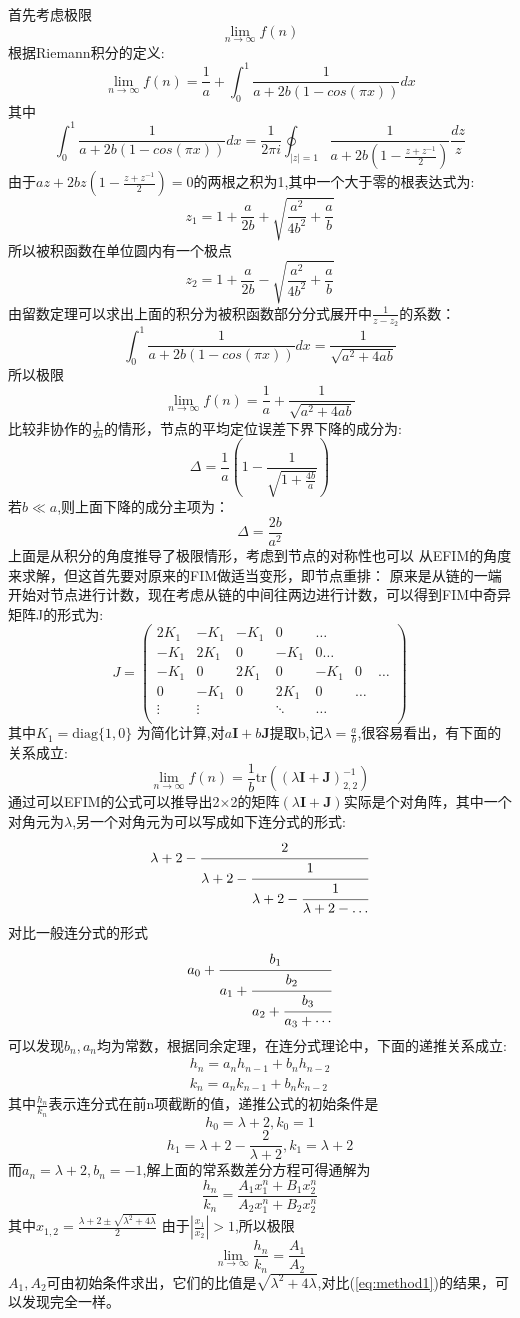 \documentclass[12pt]{article}
\theoremstyle{remark}
\begin{document}
首先考虑极限\[
\lim_{n\rightarrow \infty}f(n)
\]
根据Riemann积分的定义:
\[
\lim_{n\rightarrow \infty}f(n)=\frac{1}{a}+\int_0^1 \frac{1}{a+2b(1-cos(\pi x))}dx
\]
其中
\[
\int_0^1 \frac{1}{a+2b(1-cos(\pi x))}dx=\frac{1}{2\pi i}\oint_{|z|=1} \frac{1}{a+2b(1-\frac{z+z^{-1}}{2})}\frac{dz}{z}
\]
由于$az+2bz(1-\frac{z+z^{-1}}{2})=0$的两根之积为1,其中一个大于零的根表达式为:
\[
z_1=1+\frac{a}{2b}+\sqrt{\frac{a^2}{4b^2}+\frac{a}{b}}
\]
所以被积函数在单位圆内有一个极点
\[
z_2=1+\frac{a}{2b}-\sqrt{\frac{a^2}{4b^2}+\frac{a}{b}}
\]
由留数定理可以求出上面的积分为被积函数部分分式展开中$\frac{1}{z-z_2}$的系数：
\[
\int_0^1 \frac{1}{a+2b(1-cos(\pi x))}dx=\frac{1}{\sqrt{a^2+4ab}}
\]
所以极限
\begin{equation}\label{eq:method1}
\lim_{n\rightarrow \infty}f(n)=\frac{1}{a}+\frac{1}{\sqrt{a^2+4ab}}
\end{equation}
比较非协作的$\frac{1}{2a}$的情形，节点的平均定位误差下界下降的成分为:
\[
\Delta=\frac{1}{a}(1-\frac{1}{\sqrt{1+\frac{4b}{a}}})
\]
若$b\ll a$,则上面下降的成分主项为：
\[
\Delta=\frac{2b}{a^2}
\]
上面是从积分的角度推导了极限情形，考虑到节点的对称性也可以
从EFIM的角度来求解，但这首先要对原来的FIM做适当变形，即节点重排：
原来是从链的一端开始对节点进行计数，现在考虑从链的中间往两边进行计数，可以得到FIM中奇异矩阵J的形式为:
\[
J=\left(
\begin{array}{ccccccc}
2K_1&-K_1&-K_1&0&\dots&&\\
-K_1&2K_1&0&-K_1&0\dots&\\
-K_1&0&2K_1&0&-K_1&0&\dots\\
0&-K_1&0&2K_1&0&\dots&\\
\vdots&\vdots&&\ddots&\dots&\\
\end{array}
\right)
\]
其中$K_1=\text{diag}\{1,0\}$
为简化计算,对$a\bm{I}+b\bm{J}$提取b,记$\lambda=\frac{a}{b}$,很容易看出，有下面的关系成立:
\[
\lim_{n\rightarrow \infty}f(n)=\frac{1}{b}\text{tr}((\lambda\bm{I}+\bm{J})^{-1}_{2,2})
\]
通过可以EFIM的公式可以推导出2$\times$2的矩阵$(\lambda\bm{I}+\bm{J})$实际是个对角阵，其中一个对角元为$\lambda$,另一个对角元为可以写成如下连分式的形式:
\[
\lambda+2-\cfrac{2}{\lambda+2-\cfrac{1}{\lambda+2-\cfrac{1}{\lambda+2-\dots}}}
\]
对比一般连分式的形式\[
a_0+\cfrac{b_1}{a_1+\cfrac{b_2}{a_2+\cfrac{b_3}{a_3+\cdots}}}
\]
可以发现$b_n,a_n$均为常数，根据同余定理，在连分式理论中，下面的递推关系成立:
\begin{eqnarray}
h_n=a_nh_{n-1}+b_nh_{n-2}\\
k_n=a_nk_{n-1}+b_nk_{n-2}
\end{eqnarray}
其中$\frac{h_n}{k_n}$表示连分式在前n项截断的值，递推公式的初始条件是
\[
h_0=\lambda+2,k_0=1
\]
\[
h_1=\lambda+2-\frac{2}{\lambda+2},k_1=\lambda+2
\]
而$a_n=\lambda+2,b_n=-1$,解上面的常系数差分方程可得通解为
\[
\frac{h_n}{k_n}=\frac{A_1x_1^n+B_1x_2^n}{A_2x_1^n+B_2x_2^n}
\]
其中$x_{1,2}=\frac{\lambda+2\pm \sqrt{\lambda^2+4\lambda}}{2}$
由于$|\frac{x_1}{x_2}|>1$,所以极限
\[
\lim_{n\to \infty}\frac{h_n}{k_n}=\frac{A_1}{A_2}
\]
$A_1,A_2$可由初始条件求出，它们的比值是$\sqrt{\lambda^2+4\lambda}$,对比(\ref{eq:method1})的结果，可以发现完全一样。
\end{document}
